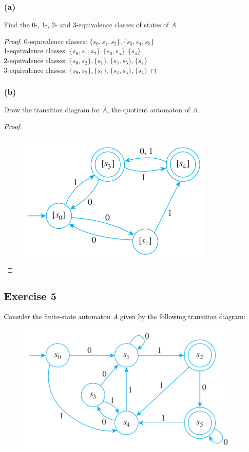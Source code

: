 \documentclass[14pt]{extarticle}
\begin{document}
\subsubsection{(a)}
Find the 0-, 1-, 2- and 3-equivalence classes of states of \(A\).

\begin{proof}
0-equivalence classes: \(\{s_0, s_1, s_2\}, \{s_3, s_4, s_5\}\) \\
1-equivalence classes: \(\{s_0, s_1, s_2\}, \{s_3, s_5\}, \{s_4\}\) \\
2-equivalence classes: \(\{s_0, s_2\}, \{s_1\}, \{s_3, s_5\}, \{s_4\}\) \\
3-equivalence classes: \(\{s_0, s_2\}, \{s_1\}, \{s_3, s_5\}, \{s_4\}\)
\end{proof}

\subsubsection{(b)}
Draw the transition diagram for \(\overline{A}\), the quotient automaton of \(A\).

\begin{proof}
\begin{figure}[ht!]
\centering
\includegraphics[scale=0.5]{../images/12.3.4.b.png}
\end{figure}
\end{proof}

\subsection{Exercise 5}
Consider the finite-state automaton \(A\) given by the following transition diagram:

\begin{figure}[ht!]
\centering
\includegraphics[scale=0.5]{../images/12.3.5.png}
\end{figure}
\end{document}
